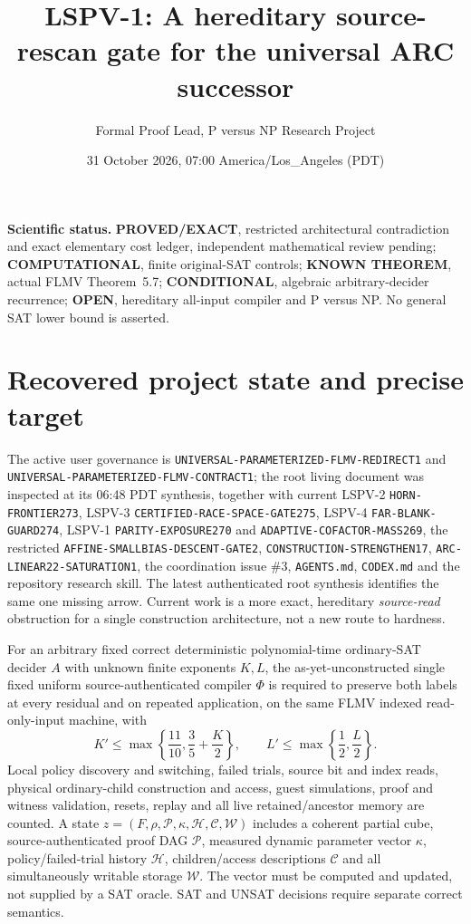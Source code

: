 \documentclass[11pt]{article}
\title{LSPV-1: A hereditary source-rescan gate for the universal ARC successor}
\author{Formal Proof Lead, P versus NP Research Project}
\date{31 October 2026, 07:00 America/Los\_Angeles (PDT)}
\begin{document}
\maketitle
\noindent\textbf{Scientific status.} \textbf{PROVED/EXACT}, restricted architectural contradiction and exact elementary cost ledger, independent mathematical review pending; \textbf{COMPUTATIONAL}, finite original-SAT controls; \textbf{KNOWN THEOREM}, actual FLMV Theorem~5.7; \textbf{CONDITIONAL}, algebraic arbitrary-decider recurrence; \textbf{OPEN}, hereditary all-input compiler and P versus NP. No general SAT lower bound is asserted.

\section{Recovered project state and precise target}
The active user governance is \texttt{UNIVERSAL-PARAMETERIZED-FLMV-REDIRECT1} and \texttt{UNIVERSAL-PARAMETERIZED-FLMV-CONTRACT1}; the root living document was inspected at its 06:48 PDT synthesis, together with current LSPV-2 \texttt{HORN-FRONTIER273}, LSPV-3 \texttt{CERTIFIED-RACE-SPACE-GATE275}, LSPV-4 \texttt{FAR-BLANK-GUARD274}, LSPV-1 \texttt{PARITY-EXPOSURE270} and \texttt{ADAPTIVE-COFACTOR-MASS269}, the restricted \texttt{AFFINE-SMALLBIAS-DESCENT-GATE2}, \texttt{CONSTRUCTION-STRENGTHEN17}, \texttt{ARC-LINEAR22-SATURATION1}, the coordination issue \#3, \texttt{AGENTS.md}, \texttt{CODEX.md} and the repository research skill. The latest authenticated root synthesis identifies the same one missing arrow. Current work is a more exact, hereditary \emph{source-read} obstruction for a single construction architecture, not a new route to hardness.

For an arbitrary fixed correct deterministic polynomial-time ordinary-SAT decider $A$ with unknown finite exponents $K,L$, the as-yet-unconstructed single fixed uniform source-authenticated compiler $\Phi$ is required to preserve both labels at every residual and on repeated application, on the same FLMV indexed read-only-input machine, with
\[
K'\le\max\left\{\frac{11}{10},\frac35+\frac K2\right\},
\qquad L'\le\max\left\{\frac12,\frac L2\right\}.
\tag{1}
\]
Local policy discovery and switching, failed trials, source bit and index reads, physical ordinary-child construction and access, guest simulations, proof and witness validation, resets, replay and all live retained/ancestor memory are counted. A state $z=(F,\rho,\mathcal P,\kappa,\mathcal H,\mathcal C,\mathcal W)$ includes a coherent partial cube, source-authenticated proof DAG $\mathcal P$, measured dynamic parameter vector $\kappa$, policy/failed-trial history $\mathcal H$, children/access descriptions $\mathcal C$ and all simultaneously writable storage $\mathcal W$. The vector must be computed and updated, not supplied by a SAT oracle. SAT and UNSAT decisions require separate correct semantics.
\end{document}

